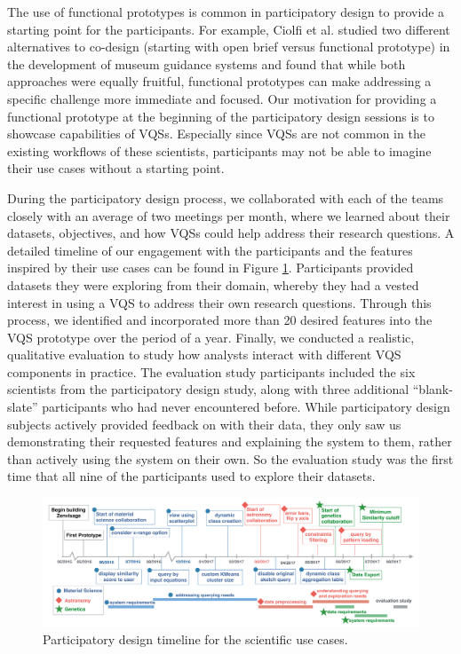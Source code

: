 \par The use of functional prototypes is common in participatory design to provide a starting point for the participants. For example, Ciolfi et al.\cite{Ciolfi2016} studied two different alternatives to co-design (starting with open brief versus functional prototype) in the development of museum guidance systems and found that while both approaches were equally fruitful, functional prototypes can make addressing a specific challenge more immediate and focused. Our motivation for providing a functional prototype at the beginning of the participatory design sessions is to showcase capabilities of VQSs. Especially since VQSs are not common in the existing workflows of these scientists, participants may not be able to imagine their use cases without a starting point. 

\par During the participatory design process, we collaborated with each of the teams closely with an average of two meetings per month, where we learned about their datasets, objectives, and how VQSs could help address their research questions. A detailed timeline of our engagement with the participants and the features inspired by their use cases can be found in Figure \ref{timeline}. Participants provided datasets they were exploring from their domain, whereby they had a vested interest in using a VQS to address their own research questions. Through this process, we identified and incorporated more than 20 desired features into the VQS prototype over the period of a year. Finally, we conducted a realistic, qualitative evaluation to study how analysts interact with different VQS components in practice. The evaluation study participants included the six scientists from the participatory design study, along with three additional ``blank-slate'' participants who had never encountered \zv before. While participatory design subjects actively provided feedback on \zv with their data, they only saw us demonstrating their requested features and explaining the system to them, rather than actively using the system on their own. So the evaluation study was the first time that all nine of the participants used \zv to explore their datasets.
	\begin{figure}[!ht]
	\centering
	\captionsetup{justification=centering,margin=2cm}
	\vspace{-10pt}
	\includegraphics[width=6in]{figures/timeline_new.pdf}
	\vspace{-6pt}\caption{Participatory design timeline for the scientific use cases.}
	\label{timeline}
	\vspace{-10pt}
	\end{figure}